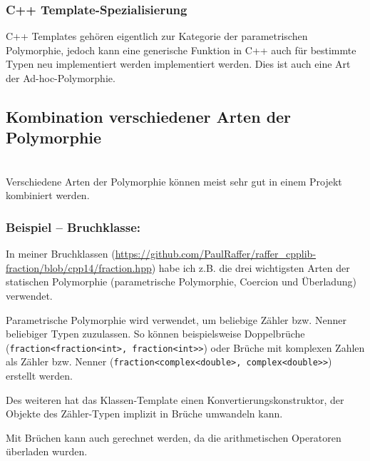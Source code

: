 					\UseRawInputEncoding{}
		
		
		\subsubsection{C++ Template-Spezialisierung}
			C++ Templates gehören eigentlich zur Kategorie der parametrischen Polymorphie, jedoch kann eine generische Funktion in C++ auch für
			bestimmte Typen neu implementiert werden implementiert werden. Dies ist auch eine Art der Ad-hoc-Polymorphie.
			
	\subsection{Kombination verschiedener Arten der Polymorphie}\mbox{}\\
		Verschiedene Arten der Polymorphie können meist sehr gut in einem Projekt kombiniert werden.
		\subsubsection*{Beispiel -- Bruchklasse:}
			In meiner Bruchklassen (\url{https://github.com/PaulRaffer/raffer_cpplib-fraction/blob/cpp14/fraction.hpp}) habe ich z.B. die
			drei wichtigsten Arten der statischen Polymorphie (parametrische Polymorphie, Coercion und Überladung) verwendet.
			
			Parametrische Polymorphie wird verwendet, um beliebige Zähler bzw. Nenner beliebiger Typen zuzulassen. So können beispielsweise
			Doppelbrüche (\lstinline|fraction<fraction<int>, fraction<int>>|) oder Brüche mit komplexen Zahlen als Zähler bzw. Nenner (\lstinline|fraction<complex<double>, complex<double>>|) erstellt
			werden.
			
			Des weiteren hat das Klassen-Template einen Konvertierungskonstruktor, der Objekte des Zähler-Typen implizit in Brüche
			umwandeln kann.
			
			Mit Brüchen kann auch gerechnet werden, da die arithmetischen Operatoren überladen wurden.